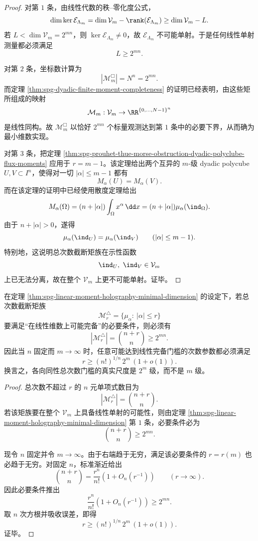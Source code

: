 \begin{proof}
对第 \(1\) 条，由线性代数的秩--零化度公式，
\[
\dim\ker \mathcal E_{\Lambda_m}
=
\dim \mathcal V_m-\rank(\mathcal E_{\Lambda_m})
\ge
\dim \mathcal V_m-L.
\]
若 \(L<\dim \mathcal V_m=2^{mn}\)，则 \(\ker \mathcal E_{\Lambda_m}\neq 0\)，故 \(\mathcal E_{\Lambda_m}\) 不可能单射。于是任何线性单射测量都必须满足
\[
L\ge 2^{mn}.
\]

对第 \(2\) 条，坐标数计算为
\[
|\mathcal M_m^{\Box}|=N^n=2^{mn}.
\]
而定理 \ref{thm:spg-dyadic-finite-moment-completeness} 的证明已经表明，由这些矩所组成的映射
\[
\mathcal M_m:\mathcal V_m\to \RR^{\{0,\dots,N-1\}^{n}}
\]
是线性同构。故 \(\mathcal M_m^{\Box}\) 以恰好 \(2^{mn}\) 个标量观测达到第 \(1\) 条中的必要下界，从而确为最小维数实现。

对第 \(3\) 条，把定理 \ref{thm:spg-prouhet-thue-morse-obstruction-dyadic-polyclube-flux-moments} 应用于 \(r=m-1\)。该定理给出两个互异的 \(m\)-级 dyadic polycube \(U,V\subset I^n\)，使得对一切 \(|\alpha|\le m-1\) 都有
\[
M_\alpha(U)=M_\alpha(V).
\]
而在该定理的证明中已经使用散度定理给出
\[
M_\alpha(\Omega)=(n+|\alpha|)\int_\Omega x^\alpha\,\dd x
=(n+|\alpha|)\mu_\alpha(\ind_\Omega).
\]
由于 \(n+|\alpha|>0\)，遂得
\[
\mu_\alpha(\ind_U)=\mu_\alpha(\ind_V)
\qquad (|\alpha|\le m-1).
\]
特别地，这说明总次数截断矩族在示性函数
\[
\ind_U,\ \ind_V\in \mathcal V_m
\]
上已无法分离，故在整个 \(\mathcal V_m\) 上更不可能单射。证毕。
\end{proof}

\begin{corollary}\label{cor:spg-total-degree-moment-threshold-exponential-scale}
在定理 \ref{thm:spg-linear-moment-holography-minimal-dimension} 的设定下，若总次数截断矩族
\[
\mathcal M_r^{\triangle}
=
\{\mu_\alpha:\ |\alpha|\le r\}
\]
要满足“在线性维数上可能完备”的必要条件，则必须有
\[
|\mathcal M_r^{\triangle}|=\binom{n+r}{n}\ge 2^{mn}.
\]
因此当 \(n\) 固定而 \(m\to\infty\) 时，任意可能达到线性完备门槛的次数参数都必须满足
\[
r\ge (n!)^{1/n}\,2^m\,(1+o(1)).
\]
换言之，各向同性总次数门槛的真实尺度是 \(2^m\) 级，而不是 \(m\) 级。
\end{corollary}
\begin{proof}
总次数不超过 \(r\) 的 \(n\) 元单项式数目为
\[
|\mathcal M_r^{\triangle}|=\binom{n+r}{n}.
\]
若该矩族要在整个 \(\mathcal V_m\) 上具备线性单射的可能性，则由定理 \ref{thm:spg-linear-moment-holography-minimal-dimension} 第 \(1\) 条，必要条件必为
\[
\binom{n+r}{n}\ge 2^{mn}.
\]

现令 \(n\) 固定并令 \(m\to\infty\)。由于右端趋于无穷，满足该必要条件的 \(r=r(m)\) 也必趋于无穷。对固定 \(n\)，标准渐近给出
\[
\binom{n+r}{n}
=
\frac{r^n}{n!}\left(1+O_n(r^{-1})\right)
\qquad (r\to\infty).
\]
因此必要条件推出
\[
\frac{r^n}{n!}\left(1+O_n(r^{-1})\right)\ge 2^{mn}.
\]
取 \(n\) 次方根并吸收误差，即得
\[
r\ge (n!)^{1/n}\,2^m\,(1+o(1)).
\]
证毕。
\end{proof}

